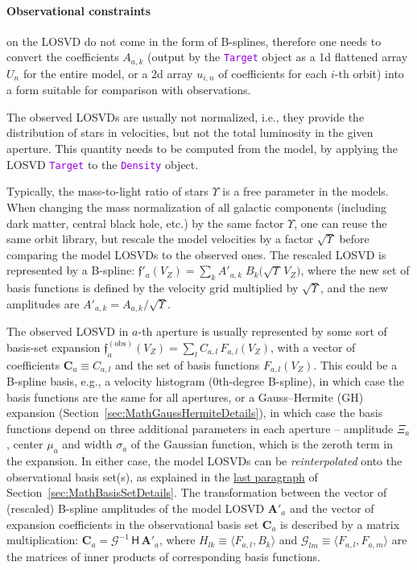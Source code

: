 \documentclass[12pt]{article}
\newcommand{\ttt}[1]{\textcolor{darkviolet}{\texttt{#1}}}
\begin{document}
\paragraph{Observational constraints} on the LOSVD do not come in the form of B-splines, therefore one needs to convert the coefficients $A_{a,k}$ (output by the \ttt{Target} object as  a 1d flattened array $U_n$ for the entire model, or a 2d array $u_{i,n}$ of coefficients for each $i$-th orbit) into a form suitable for comparison with observations.

The observed LOSVDs are usually not normalized, i.e., they provide the distribution of stars in velocities, but not the total luminosity in the given aperture. This quantity needs to be computed from the model, by applying the LOSVD \ttt{Target} to the \ttt{Density} object.

Typically, the mass-to-light ratio of stars $\Upsilon$ is a free parameter in the models. When changing the mass normalization of all galactic components (including dark matter, central black hole, etc.) by the same factor $\Upsilon$, one can reuse the same orbit library, but rescale the model velocities by a factor $\sqrt\Upsilon$ before comparing the model LOSVDs to the observed ones. The rescaled LOSVD is represented by a B-spline: 
$\mathfrak{f}'_a(V_Z) = \sum_k A'_{a,k}\;B_k\big(\sqrt\Upsilon\,V_Z\big)$, where the new set of basis functions is defined by the velocity grid multiplied by $\sqrt\Upsilon$, and the new amplitudes are $A'_{a,k} = A_{a,k}/\sqrt\Upsilon$.

The observed LOSVD in $a$-th aperture is usually represented by some sort of basis-set expansion 
$\mathfrak{f}^\mathrm{(obs)}_a(V_Z) = \sum_l C_{a,l}\,F_{a,l}(V_Z)$, with a vector of coefficients $\boldsymbol C_a \equiv C_{a,l}$ and the set of basis functions $F_{a,l}(V_Z)$. This could be a B-spline basis, e.g., a velocity histogram (0th-degree B-spline), in which case the basis functions are the same for all apertures, or a Gauss--Hermite (GH) expansion (Section~\ref{sec:MathGaussHermiteDetails}), in which case the basis functions depend on three additional parameters in each aperture -- amplitude $\Xi_a$, center $\mu_a$ and width $\sigma_a$ of the Gaussian function, which is the zeroth term in the expansion. In either case, the model LOSVDs can be \textit{reinterpolated} onto the observational basis set(s), as explained in the \hyperref[sec:MathBasisSetChange]{last paragraph} of Section~\ref{sec:MathBasisSetDetails}. The transformation between the vector of (rescaled) B-spline amplitudes of the model LOSVD $\boldsymbol A'_a$ and the vector of expansion coefficients in the observational basis set $\boldsymbol C_a$ is described by a matrix multiplication: $\boldsymbol C_a = \mathcal G^{-1}\,\mathsf H\, \boldsymbol A'_a$, where $H_{lk} \equiv \langle F_{a,l}, B_k \rangle$ and $\mathcal G_{lm} \equiv \langle F_{a,l}, F_{a,m} \rangle$ are the matrices of inner products of corresponding basis functions.
\end{document}
